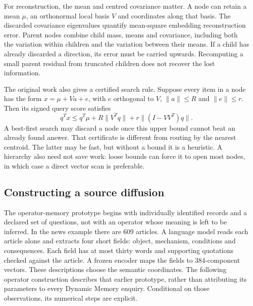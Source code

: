 For reconstruction, the mean and centred covariance matter. A node can retain a mean $\mu$, an orthonormal local basis $V$ and coordinates along that basis. The discarded covariance eigenvalues quantify mean-square embedding reconstruction error. Parent nodes combine child mass, means and covariance, including both the variation within children and the variation between their means. If a child has already discarded a direction, its error must be carried upwards. Recomputing a small parent residual from truncated children does not recover the lost information.

The original work also gives a certified search rule. Suppose every item in a node has the form $x=\mu+Va+e$, with $e$ orthogonal to $V$, $\|a\|\leq R$ and $\|e\|\leq r$. Then its signed query score satisfies
\begin{equation}
 q^Tx\leq q^T\mu+R\|V^Tq\|+r\|(I-VV^T)q\|.
 \label{eq:search-bound}
\end{equation}
A best-first search may discard a node once this upper bound cannot beat an already found answer. That certificate is different from routing by the nearest centroid. The latter may be fast, but without a bound it is a heuristic. A hierarchy also need not save work: loose bounds can force it to open most nodes, in which case a direct vector scan is preferable.

\subsection{Constructing a source diffusion}
The operator-memory prototype begins with individually identified records and a declared set of questions, not with an operator whose meaning is left to be inferred. In the news example there are 609 articles. A language model reads each article alone and extracts four short fields: object, mechanism, conditions and consequences. Each field has at most thirty words and supporting quotations checked against the article. A frozen encoder maps the fields to 384-component vectors. These descriptions choose the semantic coordinates. The following operator construction describes that earlier prototype, rather than attributing its parameters to every Dynamic Memory enquiry. Conditional on those observations, its numerical steps are explicit.

